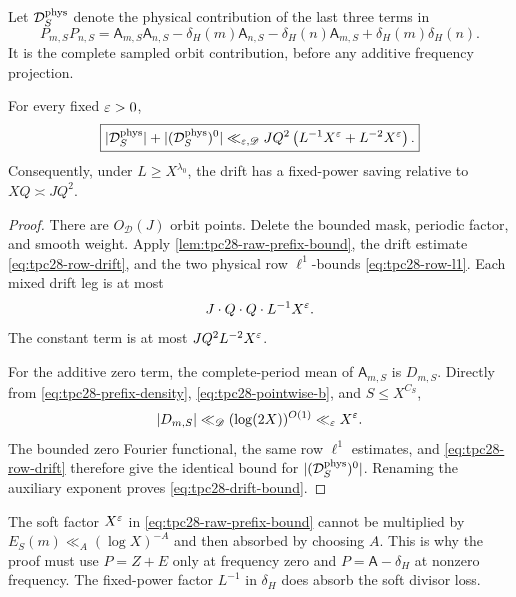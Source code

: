 Let $\mathcal D_S^{\rm phys}$ denote the physical contribution of the last
three terms in
\begin{equation}
 P_{m,S}P_{n,S}
 =\mathsf A_{m,S}\mathsf A_{n,S}
 -\delta_H(m)\mathsf A_{n,S}
 -\delta_H(n)\mathsf A_{m,S}
 +\delta_H(m)\delta_H(n).
 \label{eq:tpc28-raw-drift-expansion}
\end{equation}
It is the complete sampled orbit contribution, before any additive
frequency projection.

\begin{proposition}
\label{prop:tpc28-drift-bound}
For every fixed $\varepsilon>0$,
\begin{equation}
 \boxed{
 |\mathcal D_S^{\rm phys}|+|(\mathcal D_S^{\rm phys})^0|
 \ll_{\varepsilon,\mathscr D}
 JQ^2\left(L^{-1}X^\varepsilon+L^{-2}X^\varepsilon\right).}
 \label{eq:tpc28-drift-bound}
\end{equation}
Consequently, under $L\ge X^{\lambda_0}$, the drift has a fixed-power
saving relative to $XQ\asymp JQ^2$.
\end{proposition}

\begin{proof}
There are $O_{\mathscr D}(J)$ orbit points.  Delete the bounded mask,
periodic factor, and smooth weight.  Apply
\cref{lem:tpc28-raw-prefix-bound}, the drift estimate
\eqref{eq:tpc28-row-drift}, and the two physical row
\(\ell^1\)-bounds \eqref{eq:tpc28-row-l1}.  Each mixed drift leg is at
most
\[
 J\cdot Q\cdot Q\cdot L^{-1}X^\varepsilon.
\]
The constant term is at most $JQ^2L^{-2}X^\varepsilon$.

For the additive zero term, the complete-period mean of
$\mathsf A_{m,S}$ is $D_{m,S}$.  Directly from
\eqref{eq:tpc28-prefix-density}, \eqref{eq:tpc28-pointwise-b}, and
$S\le X^{C_S}$,
\[
 |D_{m,S}|\ll_{\mathscr D}(\log(2X))^{O(1)}\ll_\varepsilon X^\varepsilon.
\]
The bounded zero Fourier functional, the same row $\ell^1$ estimates,
and \eqref{eq:tpc28-row-drift} therefore give the identical bound for
$|(\mathcal D_S^{\rm phys})^0|$.  Renaming the auxiliary exponent proves
\eqref{eq:tpc28-drift-bound}.
\end{proof}

\begin{remark}
\label{rem:tpc28-drift-vs-E}
The soft factor $X^\varepsilon$ in \eqref{eq:tpc28-raw-prefix-bound} cannot
be multiplied by $E_S(m)\ll_A(\log X)^{-A}$ and then absorbed by
choosing $A$.  This is why the proof must use $P=Z+E$ only at
frequency zero and $P=\mathsf A-\delta_H$ at nonzero frequency.  The
fixed-power factor $L^{-1}$ in \(\delta_H\) does absorb the soft
divisor loss.
\end{remark}

